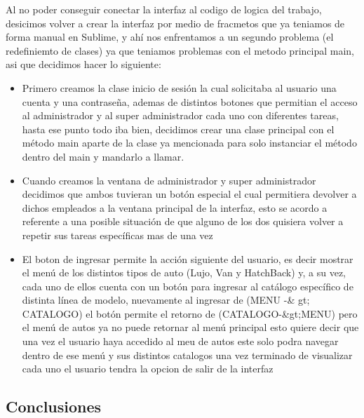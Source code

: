 \documentclass{article}
\begin{document}
Al no poder conseguir conectar la interfaz al codigo de logica del trabajo, desicimos volver a crear
la interfaz por medio de fracmetos que ya teniamos de forma manual en Sublime, y ahí nos
enfrentamos a un segundo problema (el redefiniemto de clases) ya que teniamos problemas con el
metodo principal main, asi que decidimos hacer lo siguiente:

\begin{itemize}
\item  Primero creamos la clase inicio de sesión la cual solicitaba al usuario una cuenta y una
contraseña, ademas de distintos botones que permitian el acceso al administrador y al
super administrador cada uno con diferentes tareas, hasta ese punto todo iba bien,
decidimos crear una clase principal con el método main aparte de la clase ya mencionada
para solo instanciar el método dentro del main y mandarlo a llamar.

\item Cuando creamos la ventana de administrador y super administrador decidimos que ambos
tuvieran un botón especial el cual permitiera devolver a dichos empleados a la ventana
principal de la interfaz, esto se acordo a referente a una posible situación de que alguno de
los dos quisiera volver a repetir sus tareas específicas mas de una vez

\item El boton de ingresar permite la acción siguiente del usuario, es decir mostrar el menú de los
distintos tipos de auto (Lujo, Van y HatchBack) y, a su vez, cada uno de ellos cuenta con un
botón para ingresar al catálogo específico de distinta línea de modelo, nuevamente al ingresar
de (MENU -& gt; CATALOGO) el botón permite el retorno de (CATALOGO-&gt;MENU) pero el
menú de autos ya no puede retornar al menú principal esto quiere decir que una vez el
usuario haya accedido al meu de autos este solo podra navegar dentro de ese menú y sus
distintos catalogos una vez terminado de visualizar cada uno el usuario tendra la opcion de
salir de la interfaz

\end{itemize}


\begin{center}
\section{Conclusiones}
\end{center}
\end{document}
